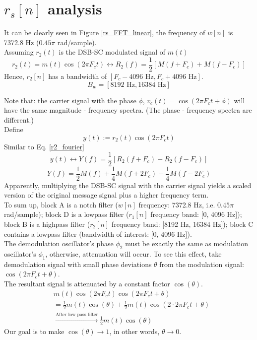 \documentclass{article}
\newenvironment{homeworkProblem}[1]{
	\section{#1}
	}{
}
\begin{document}
\begin{homeworkProblem}{$r_s[n]$ analysis}
It can be clearly seen in Figure \ref{rs_FFT_linear}, the frequency of $w[n]$ is 7372.8 Hz ($0.45\pi$ rad/sample).\\

Assuming $r_2(t)$ is the DSB-SC modulated signal of $m(t)$
\begin{equation}\label{r2_fourier}
r_2(t) = m(t) \cos(2 \pi F_c t) \leftrightarrow R_2(f) = \frac{1}{2} [M(f + F_c) + M(f - F_c)]
\end{equation}
Hence, $r_2[n]$ has a bandwidth of $[F_c-4096\text{ Hz}, F_c+4096\text{ Hz}]$.
\begin{equation}\label{DSBSC-BW}
B_w = [8192 \text{ Hz}, 16384 \text{ Hz}]
\end{equation}

Note that: the carrier signal with the phase $\phi$, $v_c(t) = \cos(2 \pi F_c t + \phi)$ will have the same magnitude - frequency spectra. (The phase - frequency spectra are different.)\\

Define
\begin{equation}
y(t) := r_2(t) \cos(2 \pi F_c t)
\end{equation}
Similar to Eq. \ref{r2_fourier}
\begin{equation}
y(t) \leftrightarrow Y(f) = \frac{1}{2} [R_2(f + F_c) + R_2(f - F_c)]
\end{equation}
\begin{equation}
Y(f) = \frac{1}{2} M(f) + \frac{1}{4} M(f + 2F_c) + \frac{1}{4} M(f - 2F_c)
\end{equation}
Apparently, multiplying the DSB-SC signal with the carrier signal yields a scaled version of the original message signal plus a higher frequency term.\\

To sum up, block A is a notch filter ($w[n]$ frequency: 7372.8 Hz, i.e. $0.45\pi$ rad/sample); block D is a lowpass filter ($r_1[n]$ frequency band: [0, 4096 Hz]); block B is a highpass filter ($r_2[n]$ frequency band: [8192 Hz, 16384 Hz]); block C contains a lowpass filter (bandwidth of interest: [0, 4096 Hz]).\\

The demodulation oscillator's phase $\phi_2$ must be exactly the same as modulation oscillator's $\phi_1$, otherwise, attenuation will occur. To see this effect, take demodulation signal with small phase deviations $\theta$ from the modulation signal: $\cos(2 \pi F_c t + \theta)$.\\

The resultant signal is attenuated by a constant factor $\cos(\theta)$.
\begin{align*}
& m(t) \cos(2 \pi F_c t) \cos(2 \pi F_c t + \theta)\\
&= \frac{1}{2} m(t) \cos(\theta) + \frac{1}{2} m(t) \cos(2 \cdot 2\pi F_c t + \theta)\\
& \xrightarrow{\text{After low pass filter}} \frac{1}{2} m(t) \cos(\theta)
\end{align*}
Our goal is to make $\cos(\theta) \to 1$, in other words, $\theta \to 0$.\\


\end{homeworkProblem}
\end{document}
